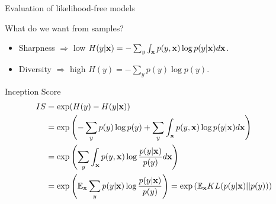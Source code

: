 \begin{frame}{Evaluation of likelihood-free models}
		\begin{block}{What do we want from samples?}
		\begin{itemize}
			\item Sharpness $\Rightarrow$ low $H(y | \mathbf{x}) = - \sum_{y} \int_{\mathbf{x}} p(y, \mathbf{x}) \log p(y | \mathbf{x}) d\mathbf{x}$.
			\item Diversity $\Rightarrow$ high $H(y)  = - \sum_{y} p(y) \log p(y)$.
		\end{itemize}
	\end{block}
	\begin{block}{Inception Score}
		\vspace{-0.3cm}
		\footnotesize
		\begin{align*}
			IS &= \exp(H(y) - H(y | \mathbf{x})) \\ 
			&= \exp \left( - \sum_{y} p(y) \log p(y) + \sum_{y} \int_{\mathbf{x}} p(y, \mathbf{x}) \log p(y | \mathbf{x}) d\mathbf{x}\right) \\
			&= \exp \left( \sum_{y} \int_{\mathbf{x}} p(y, \mathbf{x}) \log \frac{p(y | \mathbf{x})}{p(y)} d\mathbf{x}\right) \\ 
			&= \exp \left( \mathbb{E}_{\mathbf{x}} \sum_{y} p(y | \mathbf{x}) \log \frac{p(y | \mathbf{x})}{p(y)} \right) = \exp \left( \mathbb{E}_{\mathbf{x}} KL(p(y | \mathbf{x}) || p(y)) \right)
		\end{align*}
	\end{block}
\end{frame}
